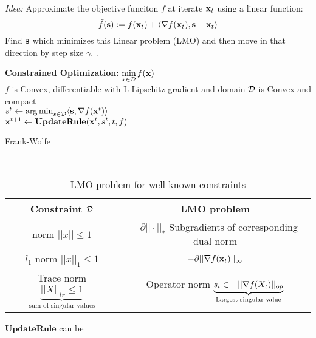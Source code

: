      \INPROGRESS
    \cite{jaggi2013revisiting} \cite{pedregosa2018frank} 
    \cite{pedregosa2018step} \cite{Demyanov70}
    \emph{Idea:} Approximate the objective funciton $f$ at iterate $\mathbf{x}_t$ using
    a linear function:
    \begin{equation*}
      \tilde{f}(\mathbf{s}) := f(\mathbf{x}_t) + \langle \nabla f(\mathbf{x}_t), \mathbf{s} - \mathbf{x}_t \rangle
    \end{equation*}
    Find $\mathbf{s}$ which minimizes this Linear problem (LMO) and then move in that
    direction by step size $\gamma$. .
    \begin{algorithm}[h]
      \textbf{Constrained Optimization:} $\min\limits_{x \in \mathcal{D}} f(\mathbf{x})$ \\
      $f$ is Convex, differentiable with L-Lipschitz gradient and domain $\mathcal{D}$
      is Convex and compact \\
       {
        $s^t \gets \operatorname*{arg\,min}_{s \in \mathcal{D}}\langle \mathbf{s}, \nabla f(\mathbf{x}^{t}) \rangle$ \\
        $\mathbf{x}^{t + 1} \gets \mathbf{UpdateRule}(\mathbf{x}^t, s^t, t, f)$
      }
      \caption{Frank-Wolfe}
      \label{alg:fw}
    \end{algorithm}
    \\
    \begin{table}[]
      \centering
      \parbox{\linewidth}{
        \begin{tabular}{|c|c|}
          Constraint $\mathcal{D}$ & LMO problem  \\
          \hline
          norm $||x|| \leq 1$ & $-\partial ||\cdot||_{*}$ Subgradients of corresponding
          dual norm \\
          $l_1$ norm $||x||_{1} \leq 1$ & $-\partial ||\nabla f(\mathbf{x}_t)||_{\infty}$ \\
          Trace norm $\underbrace{||X||_{tr} \leq 1}_{\text{sum of singular values}}$
                                        & Operator norm
                                        $\underbrace{s_t \in -||\nabla f(X_t) ||_{op}}_{\text{Largest singular value}}$\\
        \end{tabular}
        \caption{LMO problem for well known constraints}
        \label{tab:lmo}
      }  
    \end{table}
    $\mathbf{UpdateRule}$ can be
